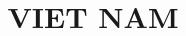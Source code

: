 \documentclass{article}
\title{VIET NAM}
\begin{document}

\begin{multicols}{2}
  
\end{multicols}
\end{document}
